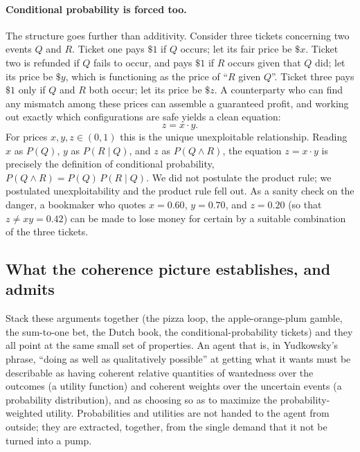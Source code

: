 \documentclass[10pt]{article}
\theoremstyle{definition}
\theoremstyle{remark}
\begin{document}
\paragraph{Conditional probability is forced too.} The structure goes further than additivity. Consider three tickets concerning two events $Q$ and $R$. Ticket one pays $\$1$ if $Q$ occurs; let its fair price be $\$x$. Ticket two is refunded if $Q$ fails to occur, and pays $\$1$ if $R$ occurs given that $Q$ did; let its price be $\$y$, which is functioning as the price of ``$R$ given $Q$''. Ticket three pays $\$1$ only if $Q$ and $R$ both occur; let its price be $\$z$. A counterparty who can find any mismatch among these prices can assemble a guaranteed profit, and working out exactly which configurations are safe yields a clean equation:
\[
z = x \cdot y.
\]
For prices $x, y, z \in (0,1)$ this is the unique unexploitable relationship. Reading $x$ as $P(Q)$, $y$ as $P(R \mid Q)$, and $z$ as $P(Q \wedge R)$, the equation $z = x \cdot y$ is precisely the definition of conditional probability, $P(Q \wedge R) = P(Q)\,P(R \mid Q)$. We did not postulate the product rule; we postulated unexploitability and the product rule fell out. As a sanity check on the danger, a bookmaker who quotes $x = 0.60$, $y = 0.70$, and $z = 0.20$ (so that $z \ne xy = 0.42$) can be made to lose money for certain by a suitable combination of the three tickets.

\subsection{What the coherence picture establishes, and admits}

Stack these arguments together (the pizza loop, the apple-orange-plum gamble, the sum-to-one bet, the Dutch book, the conditional-probability tickets) and they all point at the same small set of properties. An agent that is, in Yudkowsky's phrase, ``doing as well as qualitatively possible'' at getting what it wants must be describable as having coherent relative quantities of wantedness over the outcomes (a utility function) and coherent weights over the uncertain events (a probability distribution), and as choosing so as to maximize the probability-weighted utility. Probabilities and utilities are not handed to the agent from outside; they are extracted, together, from the single demand that it not be turned into a pump.
\end{document}
